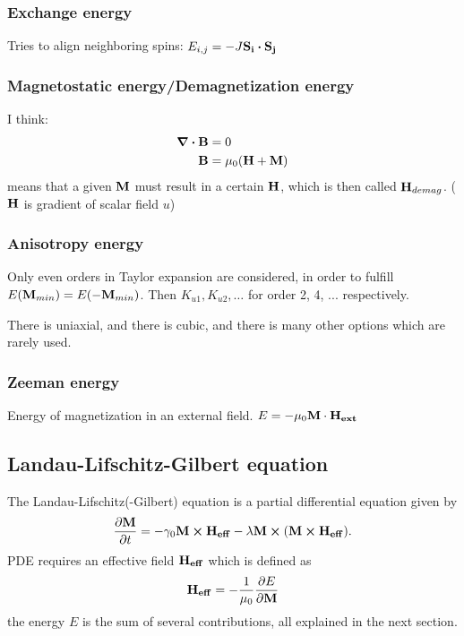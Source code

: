 \documentclass[10pt,a4paper]{article}
\begin{document}
\subsubsection{Exchange energy}
Tries to align neighboring spins:
$E_{i,j} = -J \vb{S_i} \vdot \vb{S_j}$
\subsubsection{Magnetostatic energy/Demagnetization energy}
I think:
\begin{align}
	\div{\vb{B}} &= 0 \\
	\vb{B} &= \mu_0 (\vb{H} + \vb{M})
\end{align}
means that a given $\vb{M}$ must result in a certain $\vb{H}$, which is then called $\vb{H}_{demag}$.
($\vb{H}$ is gradient of scalar field $u$)

\subsubsection{Anisotropy energy}
Only even orders in Taylor expansion are considered, in order to fulfill $E(\vb{M}_{min}) = E(-\vb{M}_{min})$. Then $K_{u1}, K_{u2}, \dots$ for order 2, 4, ... respectively.

There is uniaxial, and there is cubic, and there is many other options which are rarely used.

\subsubsection{Zeeman energy}
Energy of magnetization in an external field.
$E = -\mu_0 \vb{M} \cdot \vb{H_{ext}}$

\subsection{Landau-Lifschitz-Gilbert equation}
The Landau-Lifschitz(-Gilbert) equation is a partial differential equation given by
\begin{equation}
	\frac{\partial \vb{M}}{\partial t} = - \gamma_0 \vb{M} \cross \vb{H_{eff}} - \lambda \vb{M} \cross (\vb{M} \cross \vb{H_{eff}}) \mathrm{.}
\end{equation}
PDE requires an effective field $\vb{H_{eff}}$ which is defined as
\begin{equation}
	\vb{H_{eff}} = - \frac{1}{\mu_0} \frac{\partial E}{\partial \vb{M}}
\end{equation}
the energy $E$ is the sum of several contributions, all explained in the next section.
\end{document}
